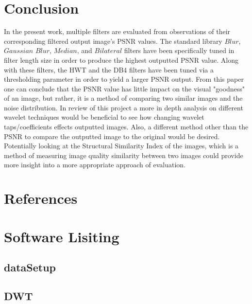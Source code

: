\documentclass{article}\raggedbottom
\begin{document}
\section{Conclusion}
In the present work, multiple filters are evaluated from observations of their corresponding filtered output image's PSNR values. The standard library $Blur$, $Gaussian$ $Blur$, $Median$, and $Bilateral$ filters have been specifically tuned in filter length size in order to produce the highest outputted PSNR value. Along with these filters, the HWT and the DB4 filters have been tuned via a thresholding parameter in order to yield a larger PSNR output. From this paper one can conclude that the PSNR value has little impact on the visual "goodness" of an image, but rather, it is a method of comparing two similar images and the noise distribution. In review of this project a more in depth analysis on different wavelet techniques would be beneficial to see how changing wavelet taps/coefficients effects outputted images. Also, a different method other than the PSNR to compare the outputted image to the original would be desired. Potentially looking at the Structural Similarity Index of the images, which is a method of measuring image quality similarity between two images could provide more insight into a more appropriate approach of evaluation.

\section{References}


 


\clearpage
\section{Software Lisiting}\label{Software_Lisiting}
\subsection{dataSetup}

\clearpage
\subsection{DWT}

\end{document}

